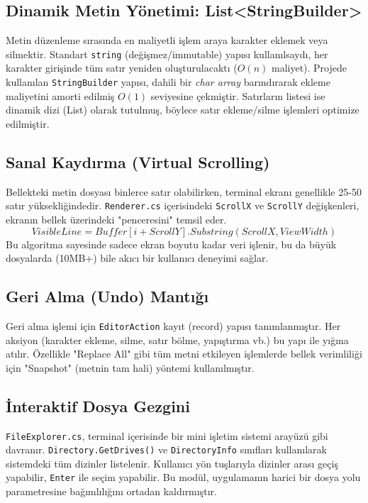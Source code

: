 \documentclass[12pt, conference]{IEEEtran}
\begin{document}
\subsection{Dinamik Metin Yönetimi: List<StringBuilder>}
Metin düzenleme sırasında en maliyetli işlem araya karakter eklemek veya silmektir. Standart \texttt{string} (değişmez/immutable) yapısı kullanılsaydı, her karakter girişinde tüm satır yeniden oluşturulacaktı ($O(n)$ maliyet). Projede kullanılan \texttt{StringBuilder} yapısı, dahili bir \textit{char array} barındırarak ekleme maliyetini amorti edilmiş $O(1)$ seviyesine çekmiştir. Satırların listesi ise dinamik dizi (List) olarak tutulmuş, böylece satır ekleme/silme işlemleri optimize edilmiştir.

\subsection{Sanal Kaydırma (Virtual Scrolling)}
Bellekteki metin dosyası binlerce satır olabilirken, terminal ekranı genellikle 25-50 satır yüksekliğindedir. \texttt{Renderer.cs} içerisindeki \texttt{ScrollX} ve \texttt{ScrollY} değişkenleri, ekranın bellek üzerindeki "penceresini" temsil eder. 
\begin{equation}
VisibleLine = Buffer[i + ScrollY].Substring(ScrollX, ViewWidth)
\end{equation}
Bu algoritma sayesinde sadece ekran boyutu kadar veri işlenir, bu da büyük dosyalarda (10MB+) bile akıcı bir kullanıcı deneyimi sağlar.

\subsection{Geri Alma (Undo) Mantığı}
Geri alma işlemi için \texttt{EditorAction} kayıt (record) yapısı tanımlanmıştır. Her aksiyon (karakter ekleme, silme, satır bölme, yapıştırma vb.) bu yapı ile yığına atılır. Özellikle "Replace All" gibi tüm metni etkileyen işlemlerde bellek verimliliği için "Snapshot" (metnin tam hali) yöntemi kullanılmıştır.

\subsection{İnteraktif Dosya Gezgini}
\texttt{FileExplorer.cs}, terminal içerisinde bir mini işletim sistemi arayüzü gibi davranır. \texttt{Directory.GetDrives()} ve \texttt{DirectoryInfo} sınıfları kullanılarak sistemdeki tüm dizinler listelenir. Kullanıcı yön tuşlarıyla dizinler arası geçiş yapabilir, \texttt{Enter} ile seçim yapabilir. Bu modül, uygulamanın harici bir dosya yolu parametresine bağımlılığını ortadan kaldırmıştır.
\end{document}
